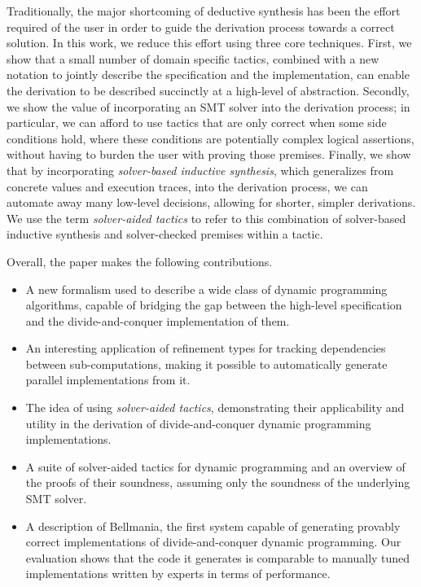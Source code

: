 Traditionally, the major shortcoming of deductive synthesis has been the effort required of the user in order to guide the derivation process towards a correct solution. In this work, we reduce this effort using three core techniques. 
First, we show that a small number of domain specific tactics, combined with a new notation to jointly describe the specification and the implementation, can enable the derivation to be described succinctly at a high-level of abstraction. Secondly, we show the value of incorporating an SMT solver into the derivation process; in particular, we can afford to use tactics that are only correct when some side conditions hold, where these conditions are potentially complex logical assertions, without having to burden the user with proving those premises. Finally, we show that by incorporating \emph{solver-based inductive synthesis},
which generalizes from concrete values and execution traces, into the derivation process, we can automate away many low-level decisions, allowing for shorter, simpler derivations. We use the term \emph{solver-aided tactics} to refer to this combination of solver-based inductive synthesis and solver-checked premises within a tactic.

Overall, the paper makes the following contributions. 
\begin{itemize}
\item A new formalism used to describe a wide class of dynamic programming algorithms, capable of bridging the gap between the high-level specification and the divide-and-conquer implementation of them.

\item An interesting application of refinement types for tracking dependencies between sub-computations, making it possible to automatically generate parallel implementations from it.

\item The idea of using \emph{solver-aided tactics}, demonstrating their applicability and utility in the derivation of divide-and-conquer dynamic programming implementations. 

\item A suite of solver-aided tactics for dynamic programming and an overview of the proofs of their soundness, assuming only the soundness of the underlying SMT solver. 

\item A description of Bellmania, the first system capable of generating provably correct implementations of di\-vide-and-conquer dynamic programming. Our evaluation shows that the code it generates is comparable to manually tuned implementations written by experts in terms of performance.
\end{itemize}

